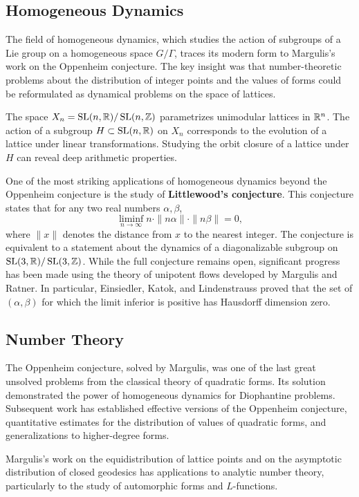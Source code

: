 \subsection{Homogeneous Dynamics}

The field of homogeneous dynamics, which studies the action of subgroups of a Lie group on a homogeneous space \(G/\Gamma\), traces its modern form to Margulis's work on the Oppenheim conjecture. The key insight was that number-theoretic problems about the distribution of integer points and the values of forms could be reformulated as dynamical problems on the space of lattices.

The space \(X_n = \operatorname{SL}(n,\mathbb{R})/\operatorname{SL}(n,\mathbb{Z})\) parametrizes unimodular lattices in \(\mathbb{R}^n\). The action of a subgroup \(H \subset \operatorname{SL}(n,\mathbb{R})\) on \(X_n\) corresponds to the evolution of a lattice under linear transformations. Studying the orbit closure of a lattice under \(H\) can reveal deep arithmetic properties.

One of the most striking applications of homogeneous dynamics beyond the Oppenheim conjecture is the study of \textbf{Littlewood's conjecture}. This conjecture states that for any two real numbers \(\alpha, \beta\),
\[
\liminf_{n \to \infty} n \cdot \|n\alpha\| \cdot \|n\beta\| = 0,
\]
where \(\|x\|\) denotes the distance from \(x\) to the nearest integer. The conjecture is equivalent to a statement about the dynamics of a diagonalizable subgroup on \(\operatorname{SL}(3,\mathbb{R})/\operatorname{SL}(3,\mathbb{Z})\). While the full conjecture remains open, significant progress has been made using the theory of unipotent flows developed by Margulis and Ratner. In particular, Einsiedler, Katok, and Lindenstrauss proved that the set of \((\alpha, \beta)\) for which the limit inferior is positive has Hausdorff dimension zero.

\subsection{Number Theory}

The Oppenheim conjecture, solved by Margulis, was one of the last great unsolved problems from the classical theory of quadratic forms. Its solution demonstrated the power of homogeneous dynamics for Diophantine problems. Subsequent work has established effective versions of the Oppenheim conjecture, quantitative estimates for the distribution of values of quadratic forms, and generalizations to higher-degree forms.

Margulis's work on the equidistribution of lattice points and on the asymptotic distribution of closed geodesics has applications to analytic number theory, particularly to the study of automorphic forms and \(L\)-functions.

